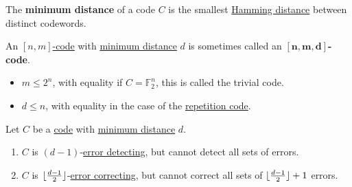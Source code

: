 \documentclass{article}
\DeclarePairedDelimiter{\floor}{\lfloor}{\rfloor}
\newcommand{\1}[1]{\mathbbm{1}_{#1}}
\begin{document}
\begin{defi}\label{def:minimumDistanceCode}
    The \textbf{minimum distance} of a code $C$ is the smallest \hyperlink{def:hammingDistance}{Hamming distance} between distinct codewords.
\end{defi}
\begin{notation}
    An \hyperlink{def:binaryCode}{$[n, m]$-code} with \hyperlink{def:minimumDistanceCode}{minimum distance} $d$ is sometimes called an \hypertarget{def:nmdCode}{$\bm{[n, m, d]}$\textbf{-code}}.
\end{notation}
\begin{remark}\leavevmode
    \begin{itemize}
        \item $m \leq 2^n$, with equality if $C = \mathbb{F}_2^n$, this is called the \hypertarget{def:trivialCode}{trivial code}.
        \item $d \leq n$, with equality in the case of the \hyperlink{def:repetitionCode}{repetition code}.
    \end{itemize}
\end{remark}
\begin{nlemma}\label{lem:2.4}
    Let $C$ be a \hyperlink{def:binaryCode}{code} with \hyperlink{def:minimumDistanceCode}{minimum distance} $d$.
    \begin{enumerate}[label=(\roman*)]
        \item $C$ is $(d-1)$-\hyperlink{def:errorDet}{error detecting}, but cannot detect all sets of errors.
        \item $C$ is $\floor{\frac{d-1}{2}}$-\hyperlink{def:errorCor}{error correcting}, but cannot correct all sets of $\floor{\frac{d-1}{2}} + 1$ errors.
    \end{enumerate}
\end{nlemma}
\end{document}
